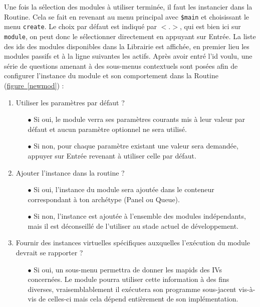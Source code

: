 \documentclass[]{article}
\newcommand{\wordlink}[2]{\hyperref[#1]{#2~\ref{#1}}}
\begin{document}
\par Une fois la sélection des modules à utiliser terminée, il faut les instancier dans la Routine. Cela se fait en revenant au menu principal avec \texttt{\$main} et choisissant le menu \texttt{create}. Le choix par défaut est indiqué par \texttt{$< . >$}, qui est bien ici sur \texttt{module}, on peut donc le sélectionner directement en appuyant sur Entrée. La liste des ids des modules disponibles dans la Librairie est affichée, en premier lieu les modules passifs et à la ligne suivantes les actifs. Après avoir entré l'id voulu, une série de questions amenant à des sous-menus contextuels sont posées afin de configurer l'instance du module et son comportement dans la Routine (\wordlink{newmod}{figure}) :\\
\begin{enumerate}
\item Utiliser les paramètres par défaut ?
	\begin{itemize}
	\item[$\bullet$] Si oui, le module verra ses paramètres courants mis à leur valeur par défaut et aucun paramètre optionnel ne sera utilisé.
	\item[$\bullet$] Si non, pour chaque paramètre existant une valeur sera demandée, appuyer sur Entrée revenant à utiliser celle par défaut.
	\end{itemize}  
\vspace{0.2cm}
\item Ajouter l'instance dans la routine ?
	\begin{itemize}
	\item[$\bullet$] Si oui, l'instance du module sera ajoutée dans le conteneur correspondant à ton archétype (Panel ou Queue).
	\item[$\bullet$] Si non, l'instance est ajoutée à l'ensemble des modules indépendants, mais il est déconseillé de l'utiliser au stade actuel de développement.
	\end{itemize}
\vspace{0.2cm}
\item Fournir des instances virtuelles spécifiques auxquelles l'exécution du module devrait se rapporter ?
	\begin{itemize}
	\item[$\bullet$] Si oui, un sous-menu permettra de donner les mapids des IVs concernées. Le module pourra utiliser cette information à des fins diverses, vraisemblablement il exécutera son programme sous-jacent vis-à-vis de celles-ci mais cela dépend entièrement de son implémentation.

\end{itemize}
\end{enumerate}
\end{document}
